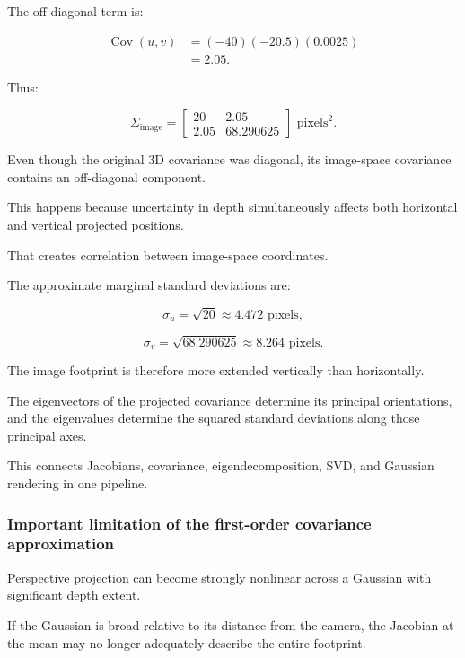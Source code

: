 The off-diagonal term is:

\[
\begin{aligned} \operatorname{Cov}(u,v) &=(-40)(-20.5)(0.0025)\\ &=\boxed{2.05}. \end{aligned}
\]

Thus:

\[
\boxed{ \Sigma_{\text{image}}= \begin{bmatrix} 20&2.05\\ 2.05&68.290625 \end{bmatrix} \text{ pixels}^2 }.
\]

Even though the original 3D covariance was diagonal, its image-space covariance contains an off-diagonal component.

This happens because uncertainty in depth simultaneously affects both horizontal and vertical projected positions.

That creates correlation between image-space coordinates.

The approximate marginal standard deviations are:

\[
\sigma_u=\sqrt{20}\approx4.472\text{ pixels},
\]

\[
\sigma_v=\sqrt{68.290625}\approx8.264\text{ pixels}.
\]

The image footprint is therefore more extended vertically than horizontally.

The eigenvectors of the projected covariance determine its principal orientations, and the eigenvalues determine the squared standard deviations along those principal axes.

This connects Jacobians, covariance, eigendecomposition, SVD, and Gaussian rendering in one pipeline.

\subsubsection{Important limitation of the first-order covariance approximation}\label{02-foundations-ii-ch021-important-limitation-of-the-first-order-covariance-approximation}

\hypertarget{02-foundations-ii-ch021-important-limitation-of-the-first-order-covariance-approximation}{}

Perspective projection can become strongly nonlinear across a Gaussian with significant depth extent.

If the Gaussian is broad relative to its distance from the camera, the Jacobian at the mean may no longer adequately describe the entire footprint.

